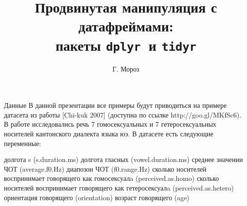 
\title[]{Продвинутая манипуляция с датафреймами:\\ пакеты \small \texttt{dplyr}\normalsize\ и \small\texttt{tidyr}\normalsize}
\author[]{Г. Мороз}
\date{}

\frame{\titlepage}
\begin{frame}{Данные}
В данной презентации все примеры будут приводиться на примере датасета из работы [Chi-kuk 2007] (доступна по ссылке http://goo.gl/MKfSc6). В работе исследовались речь 7 гомосексуальных и 7 гетеросексуальных носителей кантонского диалекта языка юэ. В датасете есть следующие переменные:
\begin{itemize}
\mytem долгота s (s.duration.ms)
\mytem долгота гласных (vowel.duration.ms)
\mytem среднее значении ЧОТ (average.f0.Hz)
\mytem диапозон ЧОТ (f0.range.Hz)
\mytem сколько носителей воспринимает говорящего как гомосексуалa (perceived.as.homo)
\mytem сколько носителей воспринимает говорящего как гетеросексуалa (perceived.as.hetero)
\mytem ориентация говорящего (orientation)
\mytem возраст говорящего (age)
\end{itemize}
\end{frame}
